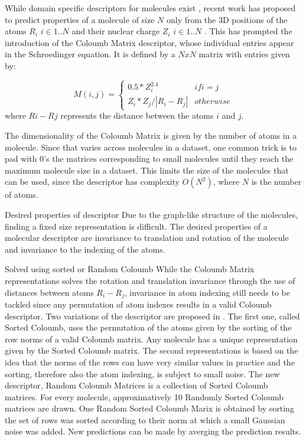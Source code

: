 \documentclass[10pt,journal,a4paper]{IEEEtran}
\begin{document}
While domain specific descriptors for molecules exist \cite{todeschini2000handbook}, recent work \cite{initialcoloumb} has proposed to predict properties of a molecule of size $N$ only from the 3D positions of the atoms $R_i$ $i\in{1..N}$ and their nuclear charge $Z_i$ $i\in{1..N}$ . This has prompted the introduction of the Coloumb Matrix descriptor, whose individual entries appear in the Schroedinger equation. It is defined by a $NxN$ matrix with entries given by:

\begin{equation}
M(i,j) = \left\{
  \begin{array}{lr}
    0.5*Z_i^{2.4} & if i = j\\
    Z_i * Z_j / |R_i - R_j| & otherwise
  \end{array}
\right.
\end{equation}
where $Ri - Rj$ represents the distance between the atoms $i$ and $j$.

The dimensionality of the Coloumb Matrix is given by the number of atoms in a molecule. Since that varies across molecules in a dataset, one common trick is to pad with 0's the matrices corresponding to small molecules until they reach the maximum molecule size in a dataset. This limits the size of the molecules that can be used, since the descriptor  has complexity $O(N^2)$, where $N$ is the number of atoms.

Desired properties of descriptor
Due to the graph-like structure of the molecules, finding a fixed size representation is difficult. The desired properties of a molecular descriptor are invariance to translation and rotation of the molecule and invariance to the indexing of the atoms.

Solved using sorted or Random Coloumb
While the Coloumb Matrix representations solves the rotation and translation invariance through the use of distances between atoms $R_i -R_j$, invariance in atom indexing still needs to be tackled since any permutation of atom indexes results in a valid Coloumb descriptor.
Two variations of the descriptor are proposed in \cite{montavon2012learning}. The first one, called Sorted Coloumb, uses the permutation of the atoms given by the sorting of the row norms of a valid Coloumb matrix. Any molecule has a unique representation given by the Sorted Coloumb matrix. The second representations is based on the idea that the norms of the rows can have very similar values in practice and the sorting, therefore also the atom indexing, is subject to small noise. The new descriptor, Random Coloumb Matrices is a collection of Sorted Coloumb matrices. For every molecule, approximatively 10 Randomly Sorted Coloumb matrices are drawn. One Random Sorted Coloumb Marix is obtained by sorting the set of  rows was sorted according to their norm at which a small Gaussian noise was added. New predictions can be made by averging the prediction results.
\end{document}
